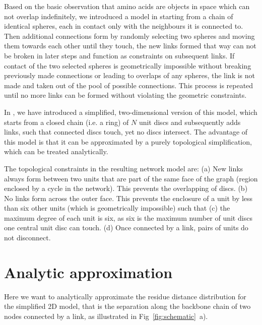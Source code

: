 \documentclass[
reprint,
twocolumn,
amsmath,amssymb,superscriptaddress,aps,
pre]{revtex4-1}
\newcommand{\blue}[1]{\textcolor{blue!80!black}{#1}}
\begin{document}
Based on the basic \blue{observation} that amino acids are objects in space which can not overlap indefinitely, we introduced a model in \cite{molkenthin2020self} starting from a chain of identical spheres, each in contact only with the neighbours it is connected to. Then additional connections form by randomly selecting two spheres and moving them towards each other until they touch, the new links formed that way can not be broken in later steps and function as constraints on subsequent links. If contact of the two selected spheres is geometrically impossible without breaking previously made connections or leading to overlaps of any spheres, the link is not made and taken out of the pool of possible connections. This process is repeated until no more links can be formed without violating the geometric constraints.

In \cite{molkenthin2016scaling}, we have introduced a simplified, two-dimensional version of this model, which starts from a closed chain \blue{(i.e. a ring)} of $N$ unit discs and subsequently adds links, such that connected discs touch, yet no discs intersect. The advantage of this model is that it can be approximated by a purely topological simplification, which can be treated analytically.

The topological constraints in the resulting network model are:
(a) New links always form between two units that are part of the same face of the graph (region enclosed by a cycle in the network). This prevents the overlapping of discs. (b) No links form across the outer face. This prevents the enclosure of a unit by less than six other units (which is geometrically impossible) such that (c) the maximum degree of each unit is six, as six is the maximum number of unit discs one central unit disc can touch. (d) Once connected by a link, pairs of units do not disconnect.

\section*{Analytic approximation}
Here we want to analytically approximate the residue distance distribution for the simplified 2D model, that is the separation along the backbone chain of two nodes connected by a link, as illustrated in Fig~\ref{fig:schematic}~a).
\end{document}
